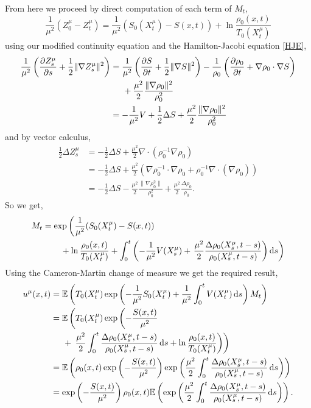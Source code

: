 \documentclass[a4paper,12pt,draft]{report}
\theoremstyle{remark}
\theoremstyle{definition}
\begin{document}
{From here we proceed by direct computation of each term of $M_t$,
$$
\frac{1}{\mu^2}(Z_0^\mu - Z_t^\mu) = \frac{1}{\mu^2}(S_0(X_t^\mu) - S(x, t)) + \ln\frac{\rho_0(x, t)}{T_0(X_t^\mu)}
$$
using our modified continuity equation and the Hamilton-Jacobi equation \eqref{HJE},
\begin{align}
\frac{1}{\mu^2}\left(\frac{\partial Z_s^\mu}{\partial s} + \frac{1}{2}\|\nabla Z_s^\mu\|^2\right) & = \frac{1}{\mu^2}\left(\frac{\partial S}{\partial t} + \frac{1}{2}\|\nabla S\|^2\right) - \frac{1}{\rho_0}\left(\frac{\partial\rho_0}{\partial t} + \nabla\rho_0\cdot\nabla S\right)\nonumber\\
& \hspace{0.5cm} + \frac{\mu^2}{2}\frac{\|\nabla\rho_0\|^2}{\rho_0^2}\nonumber\\
& = -\frac{1}{\mu^2}V + \frac{1}{2}\Delta S + \frac{\mu^2}{2}\frac{\|\nabla\rho_0\|^2}{\rho_0^2}\nonumber
\end{align}
and by vector calculus,
\begin{align}
\frac{1}{2}\Delta Z_s^\mu & = -\frac{1}{2}\Delta S + \frac{\mu^2}{2}\nabla\cdot\left(\rho_0^{-1}\nabla\rho_0\right)\nonumber\\
& = -\frac{1}{2}\Delta S + \frac{\mu^2}{2}(\nabla\rho_0^{-1}\cdot\nabla\rho_0 + \rho_0^{-1}\nabla\cdot(\nabla\rho_0))\nonumber\\
& = -\frac{1}{2}\Delta S - \frac{\mu^2}{2}\frac{\|\nabla\rho_0^2\|}{\rho_0^2} + \frac{\mu^2}{2}\frac{\Delta\rho_0}{\rho_0}.\nonumber
\end{align}
So we get,
\begin{align}
M_t & = \exp\left(\frac{1}{\mu^2}(S_0(X_t^\mu) - S(x, t))\right.\nonumber\\
& \hspace{0.75cm} + \ln\frac{\rho_0(x, t)}{T_0(X_t^\mu)} + \int_0^t\left(-\frac{1}{\mu^2}V(X_s^\mu) + \left.\frac{\mu^2}{2}\frac{\Delta\rho_0(X_s^\mu, t - s)}{\rho_0(X_s^\mu, t - s)}\right)\mathrm{d}s\right)\nonumber
\end{align}
Using the Cameron-Martin change of measure we get the required result,
\begin{align}
u^\mu(x, t) & = \mathbb{E}\left(T_0(X_t^\mu)\exp\left(-\frac{1}{\mu^2}S_0(X_t^\mu) + \frac{1}{\mu^2}\int_0^tV(X_t^\mu)\,\mathrm{d}s\right)M_t\right)\nonumber\\
& = \mathbb{E}\left(T_0(X_t^\mu)\exp\left(-\frac{S(x, t)}{\mu^2}\right.\right.\nonumber\\
& \hspace{0.5cm} + \left.\left.\frac{\mu^2}{2}\int_0^t\frac{\Delta\rho_0(X_s^\mu, t - s)}{\rho_0(X_s^\mu, t - s)}\,\mathrm{d}s + \ln\frac{\rho_0(x, t)}{T_0(X_t^\mu)}\right)\right)\nonumber\\
& = \mathbb{E}\left(\rho_0(x, t)\exp\left(-\frac{S(x, t)}{\mu^2}\right)\exp\left(\frac{\mu^2}{2}\int_0^t\frac{\Delta\rho_0(X_s^\mu, t - s)}{\rho_0(X_s^\mu, t - s)}\,\mathrm{d}s\right)\right)\nonumber\\
& = \exp\left(-\frac{S(x, t)}{\mu^2}\right)\rho_0(x, t)\mathbb{E}\left(\exp\left(\frac{\mu^2}{2}\int_0^t\frac{\Delta\rho_0(X_s^\mu, t - s)}{\rho_0(X_s^\mu, t - s)}\,\mathrm{d}s\right)\right).\nonumber
\end{align}

\qedhere
}
\end{document}
